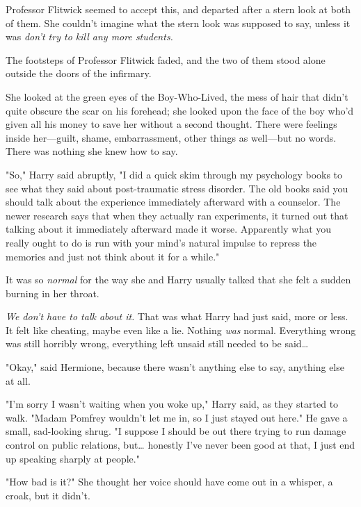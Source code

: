 Professor Flitwick seemed to accept this, and departed after a stern look at 
both of them. She couldn't imagine what the stern look was supposed to say, 
unless it was \emph{don't try to kill any more students.}

The footsteps of Professor Flitwick faded, and the two of them stood alone 
outside the doors of the infirmary.

She looked at the green eyes of the Boy-Who-Lived, the mess of hair that didn't 
quite obscure the scar on his forehead; she looked upon the face of the boy 
who'd given all his money to save her without a second thought. There were 
feelings inside her---guilt, shame, embarrassment, other things as well---but 
no words. There was nothing she knew how to say.

"So," Harry said abruptly, "I did a quick skim through my psychology books to 
see what they said about post-traumatic stress disorder. The old books said you 
should talk about the experience immediately afterward with a counselor. The 
newer research says that when they actually ran experiments, it turned out that 
talking about it immediately afterward made it worse. Apparently what you 
really ought to do is run with your mind's natural impulse to repress the 
memories and just not think about it for a while."

It was so \emph{normal} for the way she and Harry usually talked that she felt 
a sudden burning in her throat.

\emph{We don't have to talk about it.} That was what Harry had just said, more 
or less. It felt like cheating, maybe even like a lie. Nothing \emph{was} 
normal. Everything wrong was still horribly wrong, everything left unsaid still 
needed to be said{\ldots}

"Okay," said Hermione, because there wasn't anything else to say, anything else 
at all.

"I'm sorry I wasn't waiting when you woke up," Harry said, as they started to 
walk. "Madam Pomfrey wouldn't let me in, so I just stayed out here." He gave a 
small, sad-looking shrug. "I suppose I should be out there trying to run damage 
control on public relations, but{\ldots} honestly I've never been good at that, 
I just end up speaking sharply at people."

"How bad is it?" She thought her voice should have come out in a whisper, a 
croak, but it didn't.

